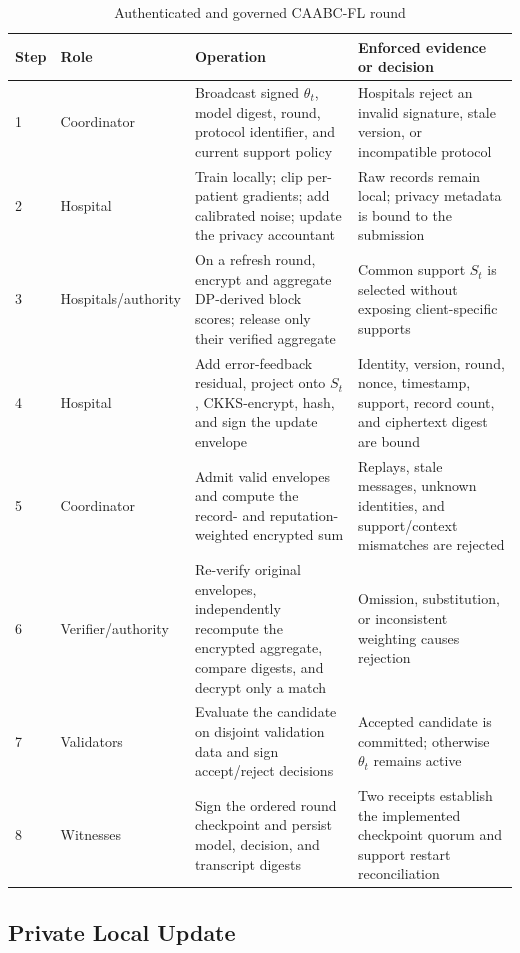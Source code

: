 \documentclass[conference]{IEEEtran}
\begin{document}
\begin{table}[t]
\caption{Authenticated and governed CAABC-FL round}
\label{tab:round-protocol}
\centering
\scriptsize
\setlength{\tabcolsep}{4pt}
\renewcommand{\arraystretch}{1.1}
\begin{tabular}{@{}p{0.7cm}p{2.8cm}p{7.0cm}p{5.3cm}@{}}
\toprule
Step & Role & Operation & Enforced evidence or decision \\
\midrule
1 & Coordinator & Broadcast signed $\theta_t$, model digest, round, protocol identifier, and current support policy & Hospitals reject an invalid signature, stale version, or incompatible protocol \\
2 & Hospital & Train locally; clip per-patient gradients; add calibrated noise; update the privacy accountant & Raw records remain local; privacy metadata is bound to the submission \\
3 & Hospitals/authority & On a refresh round, encrypt and aggregate DP-derived block scores; release only their verified aggregate & Common support $S_t$ is selected without exposing client-specific supports \\
4 & Hospital & Add error-feedback residual, project onto $S_t$, CKKS-encrypt, hash, and sign the update envelope & Identity, version, round, nonce, timestamp, support, record count, and ciphertext digest are bound \\
5 & Coordinator & Admit valid envelopes and compute the record- and reputation-weighted encrypted sum & Replays, stale messages, unknown identities, and support/context mismatches are rejected \\
6 & Verifier/authority & Re-verify original envelopes, independently recompute the encrypted aggregate, compare digests, and decrypt only a match & Omission, substitution, or inconsistent weighting causes rejection \\
7 & Validators & Evaluate the candidate on disjoint validation data and sign accept/reject decisions & Accepted candidate is committed; otherwise $\theta_t$ remains active \\
8 & Witnesses & Sign the ordered round checkpoint and persist model, decision, and transcript digests & Two receipts establish the implemented checkpoint quorum and support restart reconciliation \\
\bottomrule
\end{tabular}
\end{table}

\subsection{Private Local Update}
\end{document}
